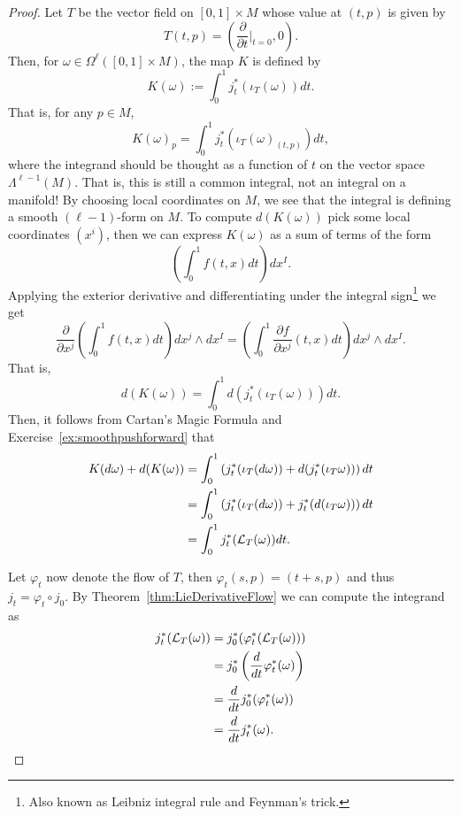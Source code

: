 \begin{proof}
  Let $T$ be the vector field on $[0,1]\times M$ whose value at $(t,p)$ is given by
  \begin{equation}
    T(t,p) = \left(\frac{\partial}{\partial t}\Big|_{t=0}, 0\right).
  \end{equation}
  Then, for $\omega\in\Omega^\ell([0,1]\times M)$, the map $K$ is defined by
  \begin{equation}
    K(\omega) := \int_0^1 j^*_t(\iota_T(\omega)) dt.
  \end{equation}
  That is, for any $p\in M$,
  \begin{equation}
    K(\omega)_p = \int_0^1 j_t^*(\iota_T(\omega)_{(t,p)})dt,
  \end{equation}
  where the integrand should be thought as a function of $t$ on the vector space $\Lambda^{\ell-1}(M)$.
  That is, this is still a common integral, not an integral on a manifold!
  By choosing local coordinates on $M$, we see that the integral is defining a smooth $(\ell-1)$-form on $M$.
  To compute $d(K(\omega))$ pick some local coordinates $(x^i)$, then we can express $K(\omega)$ as a sum of terms of the form
  \begin{equation}
    \left(\int_0^1 f(t,x) dt\right)dx^I.
  \end{equation}
  Applying the exterior derivative and differentiating under the integral sign\footnote{Also known as Leibniz integral rule and Feynman's trick.} we get
  \begin{equation}
    \frac{\partial}{\partial x^j}\left(\int_0^1 f(t,x) dt\right)dx^j\wedge dx^I = \left(\int_0^1 \frac{\partial f}{\partial x^j}(t,x) dt\right)dx^j\wedge dx^I.
  \end{equation}
  That is,
  \begin{equation}
    d(K(\omega)) = \int_0^1 d(j_t^*(\iota_T(\omega)))dt.
  \end{equation}
  Then, it follows from Cartan's Magic Formula and Exercise~\ref{ex:smoothpushforward} that
  \begin{align}
  K(d\omega) + d(K(\omega))
  &= \int_0^1\left( j_t^*(\iota_T(d\omega)) + d (j_t^*(\iota_T\omega)) \right) dt \\
  &= \int_0^1\left( j_t^*(\iota_T(d\omega)) + j_t^* (d(\iota_T\omega)) \right) dt \\ 
  &= \int_0^1 j_t^*(\mathcal{L}_T(\omega)) dt.
  \end{align}

  Let $\varphi_t$ now denote the flow of $T$, then $\varphi_t(s, p) = (t+s, p)$ and thus $j_t = \varphi_t \circ j_0$.
  By Theorem~\ref{thm:LieDerivativeFlow} we can compute the integrand as
  \begin{align}
    j_t^*(\mathcal{L}_T(\omega)) &= j^*_0(\varphi_t^*(\mathcal{L}_T(\omega))) \\
    &= j_0^*\left(\frac{d}{dt} \varphi_t^*(\omega)\right) \\
    &= \frac{d}{dt} j_0^*(\varphi_t^*(\omega)) \\
    &= \frac{d}{dt} j_t^*(\omega).
  \end{align}


\end{proof}
